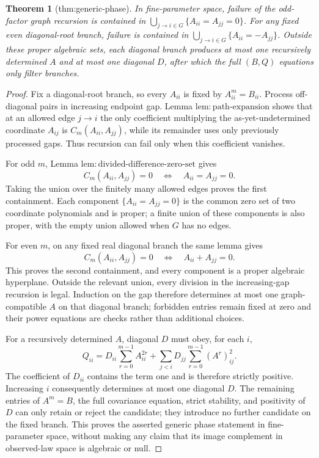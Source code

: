 \documentclass{article}
\newtheorem{theorem}{Theorem}
\begin{document}
\begin{theorem}[thm:generic-phase]\label{thm:generic-phase}
In fine-parameter space, failure of the odd-factor graph recursion is contained in \(\bigcup_{j\to i\in G}\{A_{ii}=A_{jj}=0\}\). For any fixed even diagonal-root branch, failure is contained in \(\bigcup_{j\to i\in G}\{A_{ii}=-A_{jj}\}\). Outside these proper algebraic sets, each diagonal branch produces at most one recursively determined \(A\) and at most one diagonal \(D\), after which the full \((B,Q)\) equations only filter branches.
\end{theorem}
\begin{proof}
Fix a diagonal-root branch, so every \(A_{ii}\) is fixed by \(A_{ii}^m=B_{ii}\).  Process off-diagonal pairs in increasing endpoint gap.  Lemma \(\mathrm{lem{:}path\mbox{-}expansion}\) shows that at an allowed edge \(j\to i\) the only coefficient multiplying the as-yet-undetermined coordinate \(A_{ij}\) is \(C_m(A_{ii},A_{jj})\), while its remainder uses only previously processed gaps.  Thus recursion can fail only when this coefficient vanishes.

For odd \(m\), Lemma \(\mathrm{lem{:}divided\mbox{-}difference\mbox{-}zero\mbox{-}set}\) gives
\[
 C_m(A_{ii},A_{jj})=0
 \quad\Longleftrightarrow\quad
 A_{ii}=A_{jj}=0.
\]
Taking the union over the finitely many allowed edges proves the first containment.  Each component \(\{A_{ii}=A_{jj}=0\}\) is the common zero set of two coordinate polynomials and is proper; a finite union of these components is also proper, with the empty union allowed when \(G\) has no edges.

For even \(m\), on any fixed real diagonal branch the same lemma gives
\[
 C_m(A_{ii},A_{jj})=0
 \quad\Longleftrightarrow\quad
 A_{ii}+A_{jj}=0.
\]
This proves the second containment, and every component is a proper algebraic hyperplane.  Outside the relevant union, every division in the increasing-gap recursion is legal.  Induction on the gap therefore determines at most one graph-compatible \(A\) on that diagonal branch; forbidden entries remain fixed at zero and their power equations are checks rather than additional choices.

For a recursively determined \(A\), diagonal \(D\) must obey, for each \(i\),
\[
 Q_{ii}=D_{ii}\sum_{r=0}^{m-1}A_{ii}^{2r}
 +\sum_{j<i}D_{jj}\sum_{r=0}^{m-1}(A^r)_{ij}^{2}.
\]
The coefficient of \(D_{ii}\) contains the term one and is therefore strictly positive.  Increasing \(i\) consequently determines at most one diagonal \(D\).  The remaining entries of \(A^m=B\), the full covariance equation, strict stability, and positivity of \(D\) can only retain or reject the candidate; they introduce no further candidate on the fixed branch.  This proves the asserted generic phase statement in fine-parameter space, without making any claim that its image complement in observed-law space is algebraic or null.
\end{proof}
\end{document}

